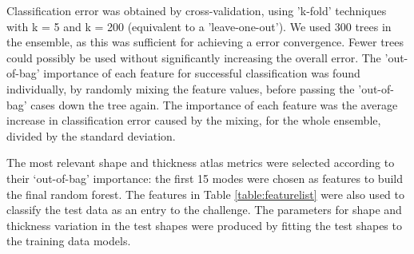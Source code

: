 \documentclass{llncs}
\begin{document}
Classification error was obtained by cross-validation, using 'k-fold' techniques with k = 5 and k = 200 (equivalent to a 'leave-one-out'). We used 300 trees in the ensemble, as this was sufficient for achieving a error convergence. Fewer trees could possibly be used without significantly increasing the overall error. The 'out-of-bag' importance of each feature for successful classification was found individually, by randomly mixing the feature values, before passing the 'out-of-bag' cases down the tree again. The importance of each feature was the average increase in classification error caused by the mixing, for the whole ensemble, divided by the standard deviation.

The most relevant shape and thickness atlas metrics were selected according to their ‘out-of-bag’ importance: the first 15 modes were chosen as features to build the final random forest. The features in Table \ref{table:featurelist} were also used to classify the test data as an entry to the challenge. The parameters for shape and thickness variation in the test shapes were produced by fitting the test shapes to the training data models.
\end{document}
